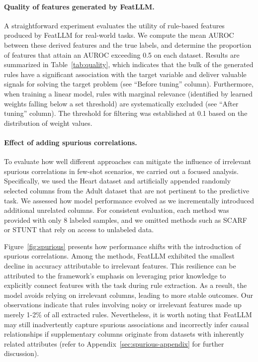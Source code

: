 \vspace*{-0.12in}
\paragraph{Quality of features generated by \textsf{FeatLLM}.}
A straightforward experiment evaluates the utility of rule-based features produced by \textsf{FeatLLM} for real-world tasks. We compute the mean AUROC between these derived features and the true labels, and determine the proportion of features that attain an AUROC exceeding 0.5 on each dataset. 
Results are summarized in Table~\ref{tab:quality}, which indicates that the bulk of the generated rules have a significant association with the target variable and deliver valuable signals for solving the target problem (see “Before tuning” column). Furthermore, when training a linear model, rules with marginal relevance (identified by learned weights falling below a set threshold) are systematically excluded (see “After tuning” column). The threshold for filtering was established at 0.1 based on the distribution of weight values.

\vspace*{-0.12in}
\paragraph{Effect of adding spurious correlations.} To evaluate how well different approaches can mitigate the influence of irrelevant spurious correlations in few-shot scenarios, we carried out a focused analysis. Specifically, we used the Heart dataset and artificially appended randomly selected columns from the Adult dataset that are not pertinent to the predictive task. We assessed how model performance evolved as we incrementally introduced additional unrelated columns. For consistent evaluation, each method was provided with only 8 labeled samples, and we omitted methods such as SCARF or STUNT that rely on access to unlabeled data.

Figure~\ref{fig:spurious} presents how performance shifts with the introduction of spurious correlations. Among the methods, \textsf{FeatLLM} exhibited the smallest decline in accuracy attributable to irrelevant features. This resilience can be attributed to the framework’s emphasis on leveraging prior knowledge to explicitly connect features with the task during rule extraction. As a result, the model avoids relying on irrelevant columns, leading to more stable outcomes. Our observations indicate that rules involving noisy or irrelevant features made up merely 1-2\% of all extracted rules. Nevertheless, it is worth noting that \textsf{FeatLLM} may still inadvertently capture spurious associations and incorrectly infer causal relationships if supplementary columns originate from datasets with inherently related attributes (refer to Appendix~\ref{sec:spurious-appendix} for further discussion).

